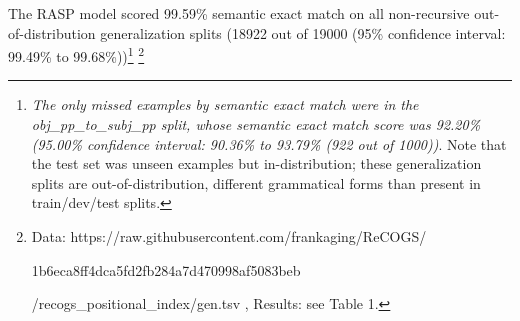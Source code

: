 \documentclass[11pt]{article}
\begin{document}
The RASP model scored 99.59\% semantic exact match on all non-recursive out-of-distribution generalization splits (18922 out of 19000 (95\% confidence interval: 99.49\% to 99.68\%))\footnote{\textit{The only missed examples by semantic exact match were in the obj\_pp\_to\_subj\_pp split, whose semantic exact match score was 92.20\% (95.00\% confidence interval: 90.36\% to 93.79\% (922 out of 1000))}. Note that the test set was unseen examples but in-distribution; these generalization splits are out-of-distribution, different grammatical forms than present in train/dev/test splits.}
\footnote{Data: https://raw.githubusercontent.com/frankaging/ReCOGS/

1b6eca8ff4dca5fd2fb284a7d470998af5083beb

/recogs\_positional\_index/gen.tsv , Results: see Table 1.
}
\end{document}
